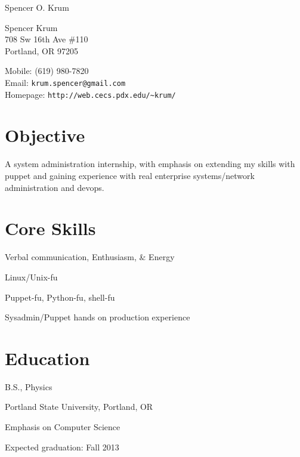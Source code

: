 \documentclass[10pt,letterpaper]{article}
\def\name{Spencer O. Krum}
\renewenvironment{itemize}{
  \begin{list}{}{
    \setlength{\leftmargin}{1.5em}
    \setlength{\itemsep}{0.25em}
    \setlength{\parskip}{0pt}
    \setlength{\parsep}{0.25em}
  }
}{
  \end{list}
}
\begin{document}
{\huge \name}


\vspace{0.25in}

\begin{minipage}[t]{0.5\textwidth}
  Spencer Krum\\
  708 Sw 16th Ave \#110\\
  Portland, OR 97205
\end{minipage}
\begin{minipage}[t]{0.5\textwidth}
  Mobile: (619) 980-7820 \\
  Email: \texttt{krum.spencer@gmail.com} \\
  Homepage: \texttt{http://web.cecs.pdx.edu/\textasciitilde krum/} \\
\end{minipage}

\section*{Objective}

A system administration internship, with emphasis on extending my skills with puppet and gaining experience with real enterprise systems/network administration and devops. \\

\begin{minipage}[t]{0.5\textwidth}
\section*{Core Skills}
\begin{itemize}
\item Verbal communication, Enthusiasm, \& Energy
\item Linux/Unix-fu
\item Puppet-fu, Python-fu, shell-fu
\item Sysadmin/Puppet hands on production experience
\end{itemize}
\end{minipage}
\begin{minipage}[t]{0.5\textwidth}
\section*{Education}
\begin{itemize}

  \item B.S., Physics
  \item Portland State University, Portland, OR
  \item Emphasis on Computer Science
  \item Expected graduation: Fall 2013
  
\end{itemize}
\end{minipage}
\end{document}
